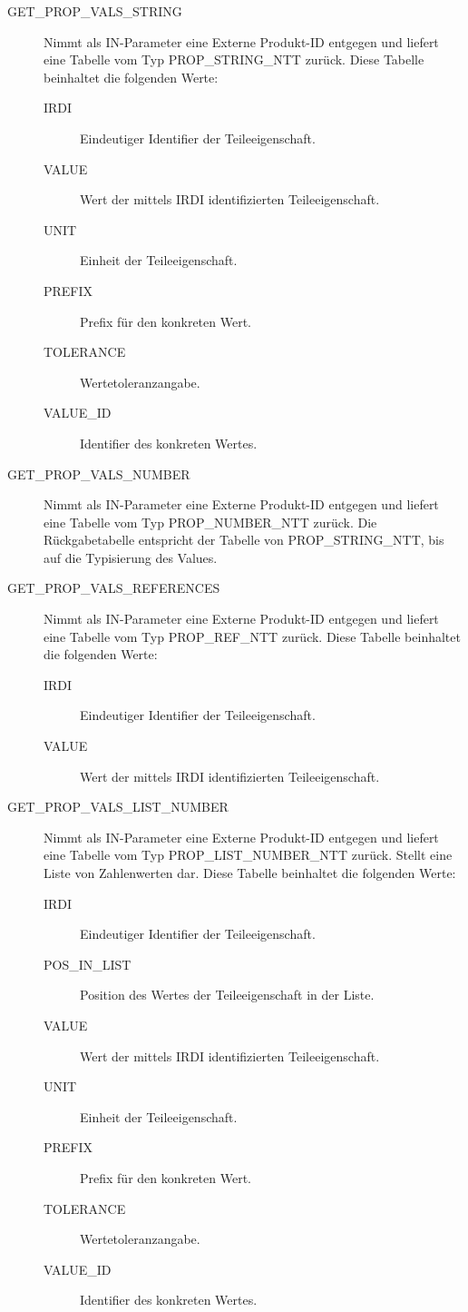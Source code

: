 \begin{description}
\item[GET\_PROP\_VALS\_STRING] Nimmt als IN-Parameter eine Externe Produkt-ID entgegen und liefert eine Tabelle vom Typ PROP\_STRING\_NTT zurück. 
Diese Tabelle beinhaltet die folgenden Werte: 
  \begin{description}
  \item[IRDI] Eindeutiger Identifier der Teileeigenschaft.
  \item[VALUE] Wert der mittels IRDI identifizierten Teileeigenschaft.
  \item[UNIT] Einheit der Teileeigenschaft.
  \item[PREFIX] Prefix für den konkreten Wert.
  \item[TOLERANCE] Wertetoleranzangabe.
  \item[VALUE\_ID] Identifier des konkreten Wertes.
  \end{description}

\item[GET\_PROP\_VALS\_NUMBER]  Nimmt als IN-Parameter eine Externe Produkt-ID entgegen und liefert eine Tabelle vom Typ PROP\_NUMBER\_NTT zurück. 
Die Rückgabetabelle entspricht der Tabelle von PROP\_STRING\_NTT, bis auf die Typisierung des Values. 
\item[GET\_PROP\_VALS\_REFERENCES]  Nimmt als IN-Parameter eine Externe Produkt-ID entgegen und liefert eine Tabelle vom Typ PROP\_REF\_NTT zurück. 
Diese Tabelle beinhaltet die folgenden Werte: 
  \begin{description}
  \item[IRDI] Eindeutiger Identifier der Teileeigenschaft.
  \item[VALUE] Wert der mittels IRDI identifizierten Teileeigenschaft.
  \end{description}
\item[GET\_PROP\_VALS\_LIST\_NUMBER] Nimmt als IN-Parameter eine Externe Produkt-ID entgegen und liefert eine Tabelle vom Typ PROP\_LIST\_NUMBER\_NTT zurück. Stellt eine Liste von Zahlenwerten dar. 
Diese Tabelle beinhaltet die folgenden Werte: 

  \begin{description}
  \item[IRDI] Eindeutiger Identifier der Teileeigenschaft.
  \item[POS\_IN\_LIST] Position des Wertes der Teileeigenschaft in der Liste.
  \item[VALUE] Wert der mittels IRDI identifizierten Teileeigenschaft.
  \item[UNIT] Einheit der Teileeigenschaft.
  \item[PREFIX] Prefix für den konkreten Wert.
  \item[TOLERANCE] Wertetoleranzangabe.
  \item[VALUE\_ID] Identifier des konkreten Wertes.
  \end{description}
  

\end{description}
